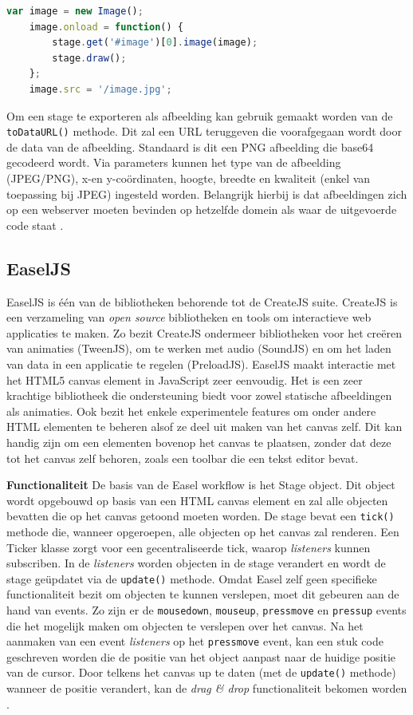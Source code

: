 \begin{lstlisting}[language=javascript]
	var image = new Image();
    image.onload = function() {
        stage.get('#image')[0].image(image);
        stage.draw();
    };
    image.src = '/image.jpg';
\end{lstlisting}

Om een stage te exporteren als afbeelding kan gebruik gemaakt worden van de \lstinline{toDataURL()} methode. Dit zal een URL teruggeven die voorafgegaan wordt door de data van de afbeelding. Standaard is dit een PNG afbeelding die base64 gecodeerd wordt. Via parameters kunnen het type van de afbeelding (JPEG/PNG), x-en y-co\"{o}rdinaten, hoogte, breedte en kwaliteit (enkel van toepassing bij JPEG) ingesteld worden. Belangrijk hierbij is dat afbeeldingen zich op een webserver moeten bevinden op hetzelfde domein als waar de uitgevoerde code staat \cite{KonvaToImage}. 

\subsection{EaselJS} \label{easeljs}
EaselJS is \'{e}\'{e}n van de bibliotheken behorende tot de CreateJS suite. CreateJS is een verzameling van \textit{open source} bibliotheken en tools om interactieve web applicaties te maken. Zo bezit CreateJS ondermeer bibliotheken voor het cre\"{e}ren van animaties (TweenJS), om te werken met audio (SoundJS) en om het laden van data in een applicatie te regelen (PreloadJS). EaselJS maakt interactie met het HTML5 canvas element in JavaScript zeer eenvoudig. Het is een zeer krachtige bibliotheek die ondersteuning biedt voor zowel statische afbeeldingen als animaties. Ook bezit het enkele experimentele features om onder andere HTML elementen te beheren alsof ze deel uit maken van het canvas zelf. Dit kan handig zijn om een elementen bovenop het canvas te plaatsen, zonder dat deze tot het canvas zelf behoren, zoals een toolbar die een tekst editor bevat. 

\textbf{Functionaliteit} \break
De basis van de Easel workflow is het Stage object. Dit object wordt opgebouwd op basis van een HTML canvas element en zal alle objecten bevatten die op het canvas getoond moeten worden. De stage bevat een \lstinline{tick()} methode die, wanneer opgeroepen, alle objecten op het canvas zal renderen. Een Ticker klasse zorgt voor een gecentraliseerde tick, waarop \textit{listeners} kunnen subscriben. In de \textit{listeners} worden objecten in de stage verandert en wordt de stage ge\"{u}pdatet via de \lstinline{update()} methode. Omdat Easel zelf geen specifieke functionaliteit bezit om objecten te kunnen verslepen, moet dit gebeuren aan de hand van events. Zo zijn er de \lstinline{mousedown}, \lstinline{mouseup}, \lstinline{pressmove} en \lstinline{pressup} events die het mogelijk maken om objecten te verslepen over het canvas. Na het aanmaken van een event \textit{listeners} op het \lstinline{pressmove} event, kan een stuk code geschreven worden die de positie van het object aanpast naar de huidige positie van de cursor. Door telkens het canvas up te daten (met de \lstinline{update()} methode) wanneer de positie verandert, kan de \textit{drag \& drop} functionaliteit bekomen worden \cite{EaselMouseInteraction}.  

